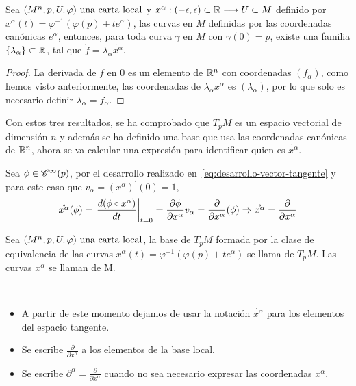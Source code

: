 \begin{proposition}
  Sea $(M^n,p,U,\varphi)\textmd{ una carta local}$ y $x^\alpha:(-\epsilon, \epsilon)\subset\mathbb{R}\longrightarrow U\subset M$ definido por $x^\alpha(t)=\varphi^{-1}(\varphi(p)+te^\alpha)$, las curvas en
  $M$
  definidas por las coordenadas canónicas $e^\alpha$, entonces, para toda curva $\gamma$ en $M$ con
  $\gamma(0)=p$, existe una familia
  $\{\lambda_\alpha\}\subset\mathbb{R}$, tal que
  $\mathring{f}=\lambda_\alpha\mathring{x^\alpha}$.
\end{proposition}
\begin{proof}
  La derivada de $f$ en $0$ es un elemento de $\mathbb{R}^n$ con coordenadas $(f_\alpha)$, como hemos visto
  anteriormente, las coordenadas de $\lambda_\alpha x^\alpha$ es $(\lambda_\alpha)$, por lo que
  solo es necesario definir $\lambda_\alpha=f_\alpha$.
\end{proof}

Con estos tres resultados, se ha comprobado que $T_pM$ es un espacio vectorial de dimensión $n$
y además se ha definido una base que usa las coordenadas canónicas de $\mathbb{R}^n$, ahora se va calcular una expresión para
identificar quien es $\mathring{x^\alpha}$.

Sea $\phi\in\mathscr{C}^\infty(p)$, por el desarrollo realizado en~\ref{eq:desarrollo-vector-tangente} y para este caso
que $v_\alpha=(x^\alpha)^{'}(0)=1$,
\[
  \mathring{x^\alpha}(\phi)=\left.\frac{d(\phi\circ x^\alpha)
  }{dt}\right|_{t=0}=\frac{\partial\phi}{\partial x^\alpha}v_\alpha=\frac{\partial}{\partial x^\alpha}(\phi)
  \Rightarrow\mathring{x^\alpha}=\frac{\partial}{\partial x^\alpha}
\]
\begin{definition}
  Sea $(M^n,p,U,\varphi)\textmd{ una carta local}$, la base de $T_p M$ formada por la clase de equivalencia de las curvas
  $x^\alpha(t)=\varphi^{-1}(\varphi(p)+te^\alpha)$ se llama  de
  $T_p M$.
  Las curvas $x^\alpha$ se llaman  de M\@.
\end{definition}
\begin{notation}
  \
  \begin{itemize}
    \item A partir de este momento dejamos de usar la notación $\mathring{x^\alpha}$ para los elementos del espacio
    tangente.
    \item Se escribe $\frac{\partial}{\partial x^\alpha}$ a los elementos de la base local.
    \item Se escribe $\partial^\alpha=\frac{\partial}{\partial x^\alpha}$ cuando no sea necesario expresar las coordenadas
    $x^\alpha$.
  \end{itemize}

\end{notation}